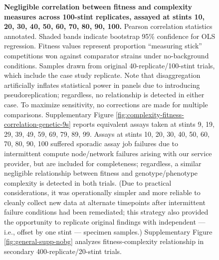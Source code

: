 \begin{figure}
\vspace{-1ex}

\caption{%
\textbf{Negligible correlation between fitness and complexity measures across 100-stint replicates, assayed at stints 10, 20, 30, 40, 50, 60, 70, 80, 90, 100.}
\footnotesize
Pearson correlation statistics annotated.
Shaded bands indicate bootstrap 95\% confidence for OLS regression.
Fitness values represent proportion ``measuring stick'' competitions won against comparator strains under no-background conditions.
Samples drawn from original 40-replicate/100-stint trials, which include the case study replicate.
Note that disaggregation artificially inflates statistical power in panels  due to introducing pseudoreplication; regardless, no relationship is detected in either case.
To maximize sensitivity, no corrections are made for multiple comparisons.
Supplementary Figure \ref{fig:complexity-fitness-correlation-genetic-9s} reports equivalent assays taken at stints 9, 19, 29, 39, 49, 59, 69, 79, 89, 99.
Assays at stints 10, 20, 30, 40, 50, 60, 70, 80, 90, 100 suffered sporadic assay job failures due to intermittent compute node/network failures arising with our service provider, but are included for completeness; regardless, a similar negligible relationship between fitness and genotype/phenotype complexity is detected in both trials.
(Due to practical considerations, it was operationally simpler and more reliable to cleanly collect new data at alternate timepoints after intermittent failure conditions had been remediated; this strategy also provided the opportunity to replicate original findings with independent --- i.e., offset by one stint --- specimen samples.)
Supplementary Figure \ref{fig:general-supp-nobg} analyzes fitness-complexity relationship in secondary 400-replicate/20-stint trials.
}
\label{fig:complexity-fitness-correlation-genetic}

\end{figure}
